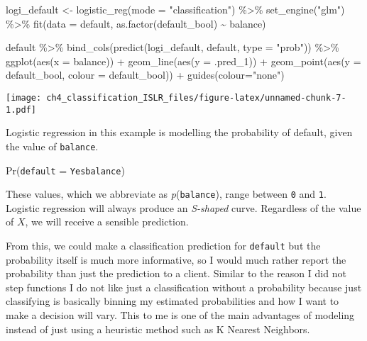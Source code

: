 \documentclass[
]{article}
\newenvironment{Shaded}{\begin{snugshade}}{\end{snugshade}}
\newcommand{\AttributeTok}[1]{\textcolor[rgb]{0.77,0.63,0.00}{#1}}
\newcommand{\FunctionTok}[1]{\textcolor[rgb]{0.00,0.00,0.00}{#1}}
\newcommand{\NormalTok}[1]{#1}
\newcommand{\OtherTok}[1]{\textcolor[rgb]{0.56,0.35,0.01}{#1}}
\newcommand{\SpecialCharTok}[1]{\textcolor[rgb]{0.00,0.00,0.00}{#1}}
\newcommand{\StringTok}[1]{\textcolor[rgb]{0.31,0.60,0.02}{#1}}
\begin{document}
\begin{Shaded}
\begin{Highlighting}[]
\NormalTok{logi\_default }\OtherTok{\textless{}{-}} \FunctionTok{logistic\_reg}\NormalTok{(}\AttributeTok{mode =} \StringTok{"classification"}\NormalTok{) }\SpecialCharTok{\%\textgreater{}\%}
  \FunctionTok{set\_engine}\NormalTok{(}\StringTok{"glm"}\NormalTok{)  }\SpecialCharTok{\%\textgreater{}\%}
  \FunctionTok{fit}\NormalTok{(}\AttributeTok{data =}\NormalTok{ default, }\FunctionTok{as.factor}\NormalTok{(default\_bool) }\SpecialCharTok{\textasciitilde{}}\NormalTok{ balance) }

\NormalTok{default }\SpecialCharTok{\%\textgreater{}\%}
  \FunctionTok{bind\_cols}\NormalTok{(}\FunctionTok{predict}\NormalTok{(logi\_default, default, }\AttributeTok{type =} \StringTok{"prob"}\NormalTok{)) }\SpecialCharTok{\%\textgreater{}\%}
  \FunctionTok{ggplot}\NormalTok{(}\FunctionTok{aes}\NormalTok{(}\AttributeTok{x =}\NormalTok{ balance)) }\SpecialCharTok{+}
  \FunctionTok{geom\_line}\NormalTok{(}\FunctionTok{aes}\NormalTok{(}\AttributeTok{y =}\NormalTok{  .pred\_1)) }\SpecialCharTok{+}
  \FunctionTok{geom\_point}\NormalTok{(}\FunctionTok{aes}\NormalTok{(}\AttributeTok{y =}\NormalTok{ default\_bool, }\AttributeTok{colour =}\NormalTok{ default\_bool)) }\SpecialCharTok{+}
  \FunctionTok{guides}\NormalTok{(}\AttributeTok{colour=}\StringTok{"none"}\NormalTok{)}
\end{Highlighting}
\end{Shaded}

\texttt{[image: ch4\_classification\_ISLR\_files/figure-latex/unnamed-chunk-7-1.pdf]}

Logistic regression in this example is modelling the probability of
default, given the value of \texttt{balance}.

Pr(\texttt{default} = \texttt{Yes}\textbar{}\texttt{balance})

These values, which we abbreviate as \emph{p}(\texttt{balance}), range
between \texttt{0} and \texttt{1}. Logistic regression will always
produce an \emph{S-shaped} curve. Regardless of the value of \(X\), we
will receive a sensible prediction.

From this, we could make a classification prediction for
\texttt{default} but the probability itself is much more informative, so
I would much rather report the probability than just the prediction to a
client. Similar to the reason I did not step functions I do not like
just a classification without a probability because just classifying is
basically binning my estimated probabilities and how I want to make a
decision will vary. This to me is one of the main advantages of modeling
instead of just using a heuristic method such as K Nearest Neighbors.
\end{document}
